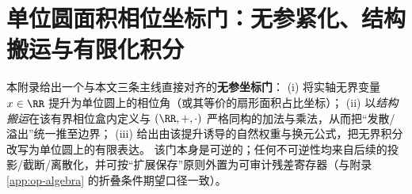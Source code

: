 \section{单位圆面积相位坐标门：无参紧化、结构搬运与有限化积分}\label{app:unit-circle-phase-gate}
本附录给出一个与本文三条主线直接对齐的\textbf{无参坐标门}：
(i) 将实轴无界变量 \(x\in\RR\) 提升为单位圆上的相位角（或其等价的扇形面积占比坐标）；
(ii) 以\emph{结构搬运}在该有界相位盒内定义与 \((\RR,+,\cdot)\) 严格同构的加法与乘法，从而把“发散/溢出”统一推至边界；
(iii) 给出由该提升诱导的自然权重与换元公式，把无界积分改写为单位圆上的有限表达。
该门本身是可逆的；任何不可逆性均来自后续的投影/截断/离散化，并可按“扩展保存”原则外置为可审计残差寄存器（与附录 \ref{app:op-algebra} 的折叠条件期望口径一致）。

















